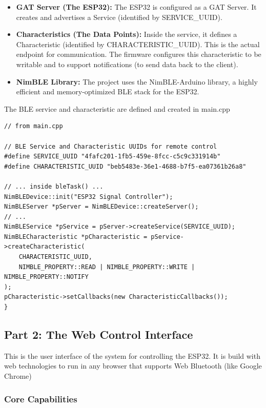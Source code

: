 \begin{itemize}
    \item \textbf{GAT Server (The ESP32):} The ESP32 is configured as a GAT Server. It creates and advertises a Service
          (identified by SERVICE\_UUID).
    \item \textbf{Characteristics (The Data Points):} Inside the service, it defines a Characteristic (identified by
          CHARACTERISTIC\_UUID). This is the actual endpoint for communication. The firmware configures this characteristic to
          be writable and to support notifications (to send data back to the client).
    \item \textbf{NimBLE Library:} The project uses the NimBLE-Arduino library, a highly efficient and memory-optimized
          BLE stack for the ESP32.
\end{itemize}

The BLE service and characteristic are defined and created in main.cpp


\begin{lstlisting}[caption={BLE service}]
// from main.cpp

// BLE Service and Characteristic UUIDs for remote control
#define SERVICE_UUID "4fafc201-1fb5-459e-8fcc-c5c9c331914b"
#define CHARACTERISTIC_UUID "beb5483e-36e1-4688-b7f5-ea07361b26a8"

// ... inside bleTask() ...
NimBLEDevice::init("ESP32 Signal Controller");
NimBLEServer *pServer = NimBLEDevice::createServer();
// ...
NimBLEService *pService = pServer->createService(SERVICE_UUID);
NimBLECharacteristic *pCharacteristic = pService->createCharacteristic(
    CHARACTERISTIC_UUID,
    NIMBLE_PROPERTY::READ | NIMBLE_PROPERTY::WRITE | NIMBLE_PROPERTY::NOTIFY
);
pCharacteristic->setCallbacks(new CharacteristicCallbacks());
}
\end{lstlisting}

\subsection{Part 2: The Web Control Interface}

This is the user interface of the system for controlling the ESP32.
It is build with web technologies to run in any browser that supports
Web Bluetooth (like Google Chrome)

\subsubsection{Core Capabilities}

